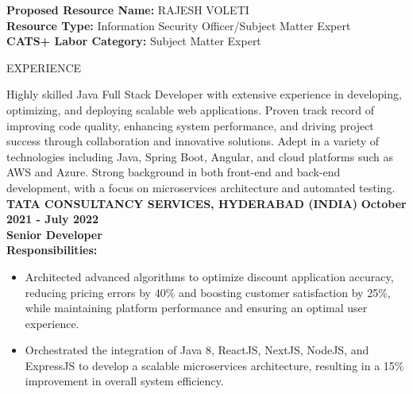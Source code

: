 \documentclass{resume} %
\begin{document}
\begin{flushleft}
    \textbf{Proposed Resource Name:} RAJESH VOLETI \\
    \textbf{Resource Type:} Information Security Officer/Subject Matter Expert \\
    \textbf{CATS+ Labor Category:} Subject Matter Expert
\end{flushleft}

\vspace{1.3em}

\begin{rSection}{EXPERIENCE}
        \begin{flushleft}
        Highly skilled Java Full Stack Developer with extensive experience in developing, optimizing, and deploying scalable web applications. Proven track record of improving code quality, enhancing system performance, and driving project success through collaboration and innovative solutions. Adept in a variety of technologies including Java, Spring Boot, Angular, and cloud platforms such as AWS and Azure. Strong background in both front{-}end and back{-}end development, with a focus on microservices architecture and automated testing. \\
        \vspace{1em} 
            \textbf{TATA CONSULTANCY SERVICES, HYDERABAD (INDIA)} \hfill \textbf{October 2021 {-} July 2022} \\
            \textbf{Senior Developer} \\
            \vspace{1em}
            \textbf{Responsibilities:} \\
            \begin{itemize}
                                    \item Architected advanced algorithms to optimize discount application accuracy, reducing pricing errors by 40\% and boosting customer satisfaction by 25\%, while maintaining platform performance and ensuring an optimal user experience.
                                    \item Orchestrated the integration of Java 8, ReactJS, NextJS, NodeJS, and ExpressJS to develop a scalable microservices architecture, resulting in a 15\% improvement in overall system efficiency.

\end{itemize}
\end{flushleft}
\end{rSection}
\end{document}
